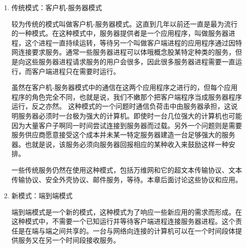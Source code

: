 \begin{enumerate}
	\item 传统模式：客户机-服务器模式

		较为传统的模式叫做客户机-服务器模式。这直到几年以前还一直是最为流行的一种模式。在这种模式中，服务器提供者是一个应用程序，叫做服务器进程，这个进程一直持续运转，等待另一个叫做客户端进程的应用程序通过因特网连接要求服务。通常一些服务器进程可以体哦概念股某特定种类的服务，但是向这些服务器进程请求服务的用户会很多，因此很多服务器进程需要一直运行，而客户端进程只在需要时运行。

		虽然在客户机-服务器模式中的通信在这两个应用程序之进行的，但每个应用程序的角色完全不同，也就是说，我们不嫩那个把客户端程序当成服务器程序运行，反之亦然。
		这种模式的一个问题时通信负荷击中由服务器承担，这说明服务器必须时一台极为强大的计算机。即使时一台几位强大的计算机也可能因为大量客户子啊同一时间尝试连接到服务器而过载。另外一个问题则是需要服务供应商愿意接受这个成本并未某一特定服务器建造一台足够强大的服务器。也就是说，该服务必须向服务器回报相应的某种收入来鼓励这样一种安排。

		一些传统服务仍然在使用这种模式，包括万维网和它的超文本传输协议、文本传输协议、安全外壳协议、邮件服务，等待。本章后面讨论这些协议和应用。
	\item 新模式：端到端模式

		端到端模式是一个新的模式，这种模式为了响应一些新应用的需求而形成。在这种模式中，不需要一个已知运行并等待客户端进程连接服务器进程。这个责任是在端与端之间共享的。一台与网络向连接的计算机可以在一个时间段体提供服务又在另一个时间段接收服务。
\end{enumerate}

